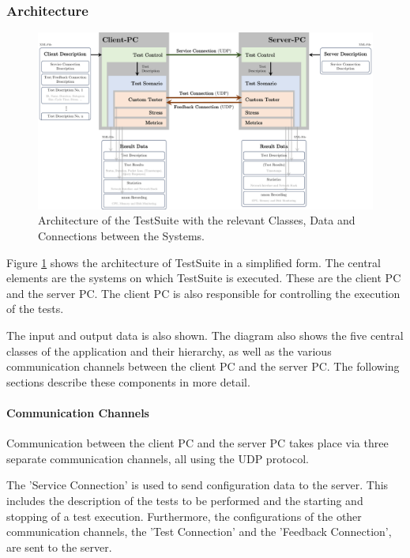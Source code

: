 \subsubsection{Architecture}

\begin{figure}
    \centering
    \includegraphics[width=1\linewidth]{figures/method/swdesign2.pdf}
    \caption[Architecture of the TestSuite with the relevant Classes, Data and Connections between the Systems]{Architecture of the TestSuite with the relevant Classes, Data and Connections between the Systems.}
    \label{fig:tsarch}
\end{figure}

Figure \ref{fig:tsarch} shows the architecture of TestSuite in a simplified form. The central elements are the systems on which TestSuite is executed. These are the client PC and the server PC. The client PC is also responsible for controlling the execution of the tests.

The input and output data is also shown. The diagram also shows the five central classes of the application and their hierarchy, as well as the various communication channels between the client PC and the server PC. The following sections describe these components in more detail.

\paragraph{Communication Channels}
Communication between the client PC and the server PC takes place via three separate communication channels, all using the UDP protocol.

The 'Service Connection' is used to send configuration data to the server. This includes the description of the tests to be performed and the starting and stopping of a test execution. Furthermore, the configurations of the other communication channels, the 'Test Connection' and the 'Feedback Connection', are sent to the server.

